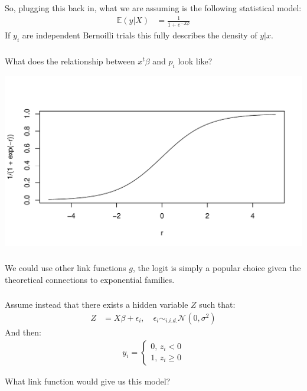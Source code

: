 \begin{frame}[fragile] \frametitle{}

So, plugging this back in, what we are assuming is the
following statistical model:
\begin{align*}
\mathbb{E} (y | X) &= \frac{1}{1 + e^{-X\beta}}
\end{align*}
\pause If $y_i$ are independent Bernoilli trials  this
fully describes the density of $y | x$.

\end{frame}

\begin{frame}[fragile] \frametitle{}

What does the relationship between $x^t \beta$ and $p_i$ look like?

\begin{center}
\includegraphics[width=\textwidth]{img/fig01.pdf}
\end{center}

\end{frame}

\begin{frame}[fragile] \frametitle{}

We could use other link functions $g$, the logit is simply
a popular choice given the theoretical connections to exponential
families.

\end{frame}

\begin{frame}[fragile] \frametitle{}

Assume instead that there exists a hidden variable $Z$ such that:
\begin{align*}
Z &= X\beta + \epsilon_i, \quad \epsilon_i \sim_{i.i.d.} \mathcal{N}(0, \sigma^2)
\end{align*}
And then:
\begin{align*}
y_i = \left\{ \begin{array}{c} 0, \, z_i < 0 \\ 1, \, z_i \geq 0 \end{array}  \right.
\end{align*}

\pause What link function would give us this model?

\end{frame}

